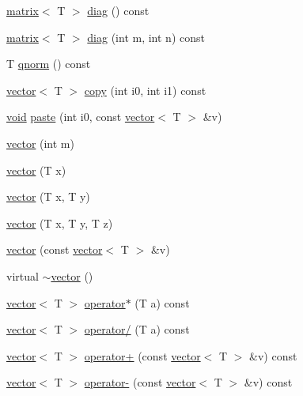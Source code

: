 \begin{DoxyCompactItemize}
\hyperlink{classlibNumerics_1_1matrix}{matrix}$<$ T $>$ \hyperlink{classlibNumerics_1_1vector_a093952f9c25540682e3a97c11192cd17}{diag} () const 
\item 
\hyperlink{classlibNumerics_1_1matrix}{matrix}$<$ T $>$ \hyperlink{classlibNumerics_1_1vector_a5cd9ed207ffb02be6d8e0302b125fc8f}{diag} (int m, int n) const 
\item 
T \hyperlink{classlibNumerics_1_1vector_ac140ac952a0acc6c26a5110a0bddd893}{qnorm} () const 
\item 
\hyperlink{classlibNumerics_1_1vector}{vector}$<$ T $>$ \hyperlink{classlibNumerics_1_1vector_aad84cb6b6ba2b654644eda20cbcd2a4c}{copy} (int i0, int i1) const 
\item 
\hyperlink{png_8h_aa8c59027f9ab2769342f248709d68d17}{void} \hyperlink{classlibNumerics_1_1vector_af4ea0bbf3302600283134e0073bac06d}{paste} (int i0, const \hyperlink{classlibNumerics_1_1vector}{vector}$<$ T $>$ \&v)
\item 
\hyperlink{classlibNumerics_1_1vector_a0b6ba62d806153883bff6d9bb434a098}{vector} (int m)
\item 
\hyperlink{classlibNumerics_1_1vector_a3ea5ce3593cbdfdde40c27170df29223}{vector} (T x)
\item 
\hyperlink{classlibNumerics_1_1vector_a4c6210dd9967dfcd0054d438ae48832a}{vector} (T x, T y)
\item 
\hyperlink{classlibNumerics_1_1vector_ad54b95d1ec6ff9a9681821525478e660}{vector} (T x, T y, T z)
\item 
\hyperlink{classlibNumerics_1_1vector_a78fe70d80e248e4b245387d89ad4db20}{vector} (const \hyperlink{classlibNumerics_1_1vector}{vector}$<$ T $>$ \&v)
\item 
virtual \hyperlink{classlibNumerics_1_1vector_ae914f347affffad704952b4c8d191b5f}{$\sim$vector} ()
\item 
\hyperlink{classlibNumerics_1_1vector}{vector}$<$ T $>$ \hyperlink{classlibNumerics_1_1vector_a3960f8c9e0c215db5f9b7b3b5423945d}{operator$\ast$} (T a) const 
\item 
\hyperlink{classlibNumerics_1_1vector}{vector}$<$ T $>$ \hyperlink{classlibNumerics_1_1vector_a65f2ac0efc9cddc43a47a4dbc9290ea4}{operator/} (T a) const 
\item 
\hyperlink{classlibNumerics_1_1vector}{vector}$<$ T $>$ \hyperlink{classlibNumerics_1_1vector_a4b6cdff2aa8053a39fa2156c9f86a269}{operator+} (const \hyperlink{classlibNumerics_1_1vector}{vector}$<$ T $>$ \&v) const 
\item 
\hyperlink{classlibNumerics_1_1vector}{vector}$<$ T $>$ \hyperlink{classlibNumerics_1_1vector_a556b807143135fef01bc0a2487f7fe3d}{operator-\/} (const \hyperlink{classlibNumerics_1_1vector}{vector}$<$ T $>$ \&v) const 

\end{DoxyCompactItemize}
